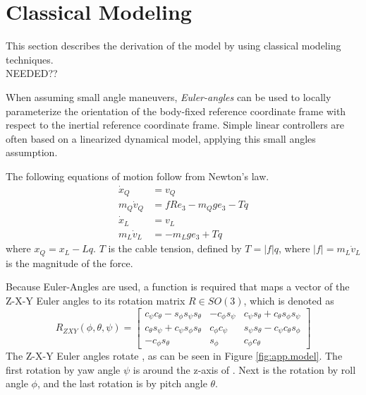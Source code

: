 \section{Classical Modeling}\label{sec:mod.clas}

This section describes the derivation of the model by using classical modeling techniques.\\
NEEDED??



When assuming small angle maneuvers, \textit{Euler-angles} can be used to locally parameterize the orientation of the body-fixed reference coordinate frame with respect to the inertial reference coordinate frame. Simple linear controllers are often based on a linearized dynamical model, applying this small angles assumption. 

The following equations of motion follow from Newton's law.
\begin{equation}\label{eq:newton}
\begin{aligned}
\dot{x}_Q &= v_Q\\
m_Q\dot{v}_Q &=fRe_3-m_Qge_3-Tq\\
\dot{x}_L &= v_L\\
m_L\dot{v}_L &=-m_Lge_3+Tq
\end{aligned}
\end{equation}
where $ x_Q = x_L-Lq $. $ T $ is the cable tension, defined by $ T=|f| q $, where $ |f| = m_L\dot{v}_L $ is the magnitude of the force.

Because Euler-Angles are used, a function is required that maps a vector of the Z-X-Y Euler angles to its rotation matrix $ R\in SO(3) $, which is denoted as \cite{Mahony2012}
\begin{equation}\label{key}
R_{ZXY}({\phi},{\theta},{\psi})=\begin{bmatrix}
c_{\psi}c_{\theta}-s_{\phi}s_{\psi}s_{\theta}&-c_{\phi}s_{\psi}&c_{\psi}s_{\theta}+c_{\theta}s_{\phi}s_{\psi}\\
c_{\theta}s_{\psi}+c_{\psi}s_{\phi}s_{\theta}&c_{\phi}c_{\psi}&s_{\psi}s_{\theta}-c_{\psi}c_{\theta}s_{\phi}\\
-c_{\phi}s_{\theta}&s_{\phi}&c_{\phi}c_{\theta}
\end{bmatrix}
\end{equation}
The Z-X-Y Euler angles rotate \BF, as can be seen in Figure \ref{fig:app.model}. The first rotation by yaw angle $ \psi $ is around the z-axis of \IF. Next is the rotation by roll angle $ \phi $, and the last rotation is by pitch angle $ \theta $.


